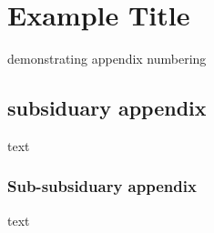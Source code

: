 \chapter{Example Title}
demonstrating appendix numbering
\section{subsiduary appendix}
text
\subsection{Sub-subsiduary appendix}
text
